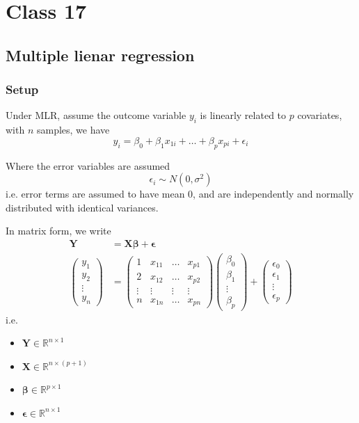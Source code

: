 \section{Class 17}

\subsection{Multiple lienar regression}

\subsubsection{Setup}

Under MLR, assume the outcome variable $y_i$ is linearly related to $p$ covariates, with $n$ samples, we have 
\[
    y_i  = \beta_0 + \beta_1 x_{1i} + \hdots + \beta_p x_{pi} + \epsilon_i
\]

Where the error variables are assumed 
\[
    \epsilon_i \sim N(0, \sigma^2)
\]
i.e. error terms are assumed to have mean 0, and are independently and normally distributed with identical variances. 

In matrix form, we write 
\begin{align*}
    \bm{Y} &= \bm{X \beta} + \bm{\epsilon}\\ 
    \begin{pmatrix} y_1 \\ y_2 \\ \vdots \\ y_n \end{pmatrix} &= 
    \begin{pmatrix} 
      1 & x_{11}  & \hdots & x_{p1} \\
      2 & x_{12}  & \hdots & x_{p2} \\
      \vdots & \vdots & \vdots & \vdots \\
      n & x_{1n}  & \hdots & x_{pn}
    \end{pmatrix} 
    \begin{pmatrix} 
      \beta_0 \\ \beta_1 \\ \vdots \\ \beta_p  
    \end{pmatrix} + 
    \begin{pmatrix} 
      \epsilon_0 \\ \epsilon_1 \\ \vdots \\ \epsilon_p  
    \end{pmatrix}
\end{align*}
i.e. 
\begin{itemize}
    \item $\bm{Y} \in \mathbb{R}^{n \times 1}$
    \item $\bm{X} \in \mathbb{R}^{n \times (p + 1)}$
    \item $\bm{\beta} \in \mathbb{R}^{p \times 1}$
    \item $\bm{\epsilon} \in \mathbb{R}^{n \times 1}$
\end{itemize} 

